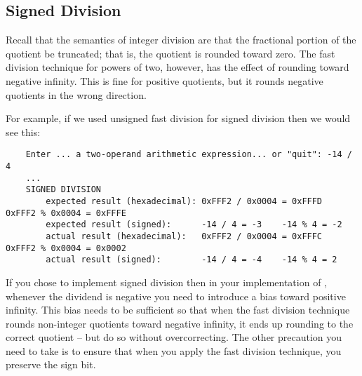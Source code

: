 \subsection{Signed Division}

Recall that the semantics of integer division are that the fractional portion of the quotient be truncated;
that is, the quotient is rounded toward zero.
The fast division technique for powers of two, however, has the effect of rounding toward negative infinity.
This is fine for positive quotients, but it rounds negative quotients in the wrong direction.

For example, if we used unsigned fast division for signed division then we would see this:
\begin{small}\begin{verbatim}
    Enter ... a two-operand arithmetic expression... or "quit": -14 / 4
    ...
    SIGNED DIVISION
        expected result (hexadecimal): 0xFFF2 / 0x0004 = 0xFFFD    0xFFF2 % 0x0004 = 0xFFFE
        expected result (signed):      -14 / 4 = -3    -14 % 4 = -2
        actual result (hexadecimal):   0xFFF2 / 0x0004 = 0xFFFC    0xFFF2 % 0x0004 = 0x0002
        actual result (signed):        -14 / 4 = -4    -14 % 4 = 2
\end{verbatim}\end{small}

If you chose to implement signed division then in your implementation of , whenever the dividend is negative you need to introduce a bias toward positive infinity.
This bias needs to be sufficient so that when the fast division technique rounds non-integer quotients toward negative infinity, it ends up rounding to the correct quotient -- but do so without overcorrecting.
The other precaution you need to take is to ensure that when you apply the fast division technique, you preserve the sign bit.
\begin{description}
\end{description}
